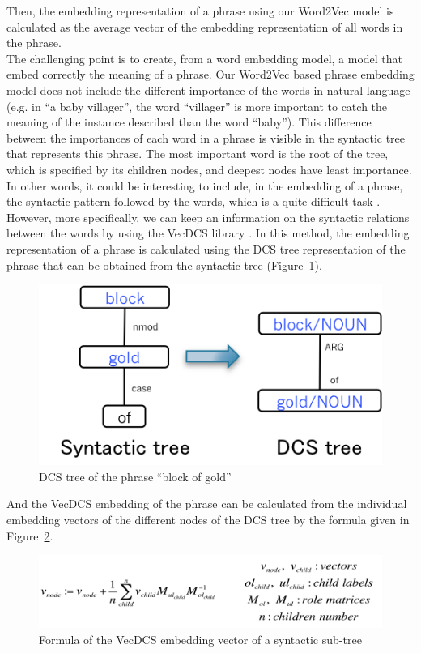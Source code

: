\documentclass[12pt]{article}
\begin{document}
Then, the embedding representation of a phrase using our Word2Vec model is calculated as the average vector of the embedding representation of all words in the phrase.\\
The challenging point is to create, from a word embedding model, a model that embed correctly the meaning of a phrase. Our Word2Vec based phrase embedding model does not include the different importance of the words in natural language (e.g. in ``a baby villager'', the word ``villager'' is more important to catch the meaning of the instance described than the word ``baby''). This difference between the importances of each word in a phrase is visible in the syntactic tree that represents this phrase. The most important word is the root of the tree, which is specified by its children nodes, and deepest nodes have least importance.\\
In other words, it could be interesting to include, in the embedding of a phrase, the syntactic pattern followed by the words, which is a quite difficult task \cite{takase2016modeling}.
However, more specifically, we can keep an information on the syntactic relations between the words by using the VecDCS library \cite{tian2016learning}. In this method, the embedding representation of a phrase is calculated using the DCS tree representation of the phrase that can be obtained from the syntactic tree (Figure~\ref{dcsTree}).

\begin{figure}[!ht]
   \centering \includegraphics[width=0.3\linewidth]{Figures/Semantic_Parsing/dcsTree.png}
   \caption{\label{dcsTree} DCS tree of the phrase ``block of gold''}
\end{figure}

And the VecDCS embedding of the phrase can be calculated from the individual embedding vectors of the different nodes of the DCS tree by the formula given in Figure~\ref{vecDCSFormula}.

\begin{figure}[!ht]
   \centering \includegraphics[width=\linewidth]{Figures/Semantic_Parsing/vecDCS.png}
   \caption{\label{vecDCSFormula} Formula of the VecDCS embedding vector of a syntactic sub-tree}
\end{figure}
\end{document}
